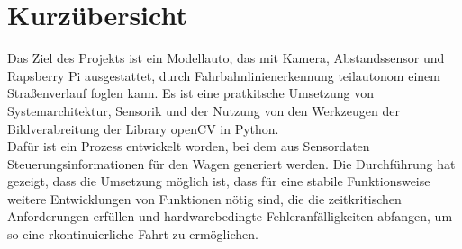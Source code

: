 \section*{Kurzübersicht}
Das Ziel des Projekts ist ein Modellauto, das mit Kamera, Abstandssensor und
Rapsberry Pi ausgestattet, durch Fahrbahnlinienerkennung teilautonom einem
Straßenverlauf foglen kann. Es ist eine pratkitsche Umsetzung von Systemarchitektur, Sensorik und der Nutzung von den Werkzeugen der Bildverabreitung der Library openCV in Python.\\
Dafür ist ein Prozess entwickelt worden, bei dem aus Sensordaten
Steuerungsinformationen für den Wagen generiert werden. Die Durchführung hat
gezeigt, dass die Umsetzung möglich ist, dass für eine stabile Funktionsweise
weitere Entwicklungen von Funktionen nötig sind, die die zeitkritischen
Anforderungen erfüllen und hardwarebedingte Fehleranfälligkeiten abfangen, um so
eine rkontinuierliche Fahrt zu ermöglichen.\\
